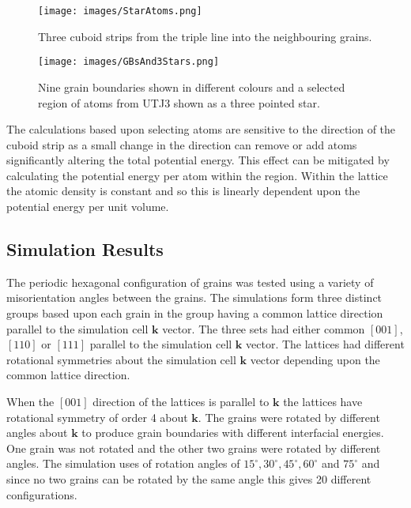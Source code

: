 \documentclass[12pt,a4paper]{book}
\begin{document}
\begin{figure}
	\texttt{[image: images/StarAtoms.png]} 
	\label{fig:StarAtoms}
	\caption{Three cuboid strips from the triple line into the
	neighbouring grains.}
\end{figure}


\begin{figure}
	\texttt{[image: images/GBsAnd3Stars.png]} 
	\label{fig:GBsandStar}
	\caption{Nine grain boundaries shown in different colours and a selected region of atoms from UTJ3 shown as a three pointed star.}
	   
\end{figure}

The calculations based upon selecting atoms are sensitive to the direction of the cuboid strip as a small change in the direction can remove or add atoms significantly altering the total potential energy. This effect can be mitigated by calculating the potential energy per atom within the region. Within the lattice the atomic density is constant and so this is linearly dependent upon the potential energy per unit volume. 

\subsection{Simulation Results} \label{sec:SimulationResults}

The periodic hexagonal configuration of grains was tested using a variety of misorientation angles between the grains.  The simulations form three distinct groups based upon each grain in the group having a common lattice direction parallel to the simulation cell $\mathbf{k}$ vector. The three sets had either common $[0 0 1]$, $[1 1 0]$ or $[1 1 1]$ parallel to the simulation cell $\mathbf{k}$ vector. The lattices had different rotational symmetries about the simulation cell $\mathbf{k}$ vector depending upon the common lattice direction.

When the $[0 0 1]$ direction of the lattices is parallel to $\mathbf{k}$ the lattices have rotational symmetry of order 4 about $\mathbf{k}$.  The grains were rotated by different angles about $\mathbf{k}$ to produce grain boundaries with different interfacial energies. One grain was not rotated and the other two grains were rotated by different angles. The simulation uses of rotation angles of $15^{\circ},30^{\circ},45^{\circ},60^{\circ}$ and $75^{\circ}$ and since no two grains can be rotated by the same angle this gives 20 different configurations.
\end{document}
